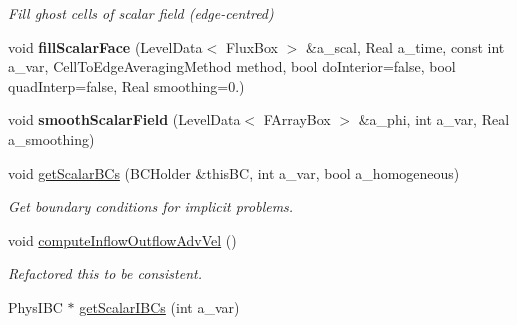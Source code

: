 \begin{DoxyCompactItemize}
\begin{DoxyCompactList}\small\item\em Fill ghost cells of scalar field (edge-\/centred) \end{DoxyCompactList}\item 
\hypertarget{class_a_m_r_level_mushy_layer_a20fcbe7201a07b0e90405b45f806ffc7}{void {\bfseries fill\-Scalar\-Face} (Level\-Data$<$ Flux\-Box $>$ \&a\-\_\-scal, Real a\-\_\-time, const int a\-\_\-var, Cell\-To\-Edge\-Averaging\-Method method, bool do\-Interior=false, bool quad\-Interp=false, Real smoothing=0.)}\label{class_a_m_r_level_mushy_layer_a20fcbe7201a07b0e90405b45f806ffc7}

\item 
\hypertarget{class_a_m_r_level_mushy_layer_aea3d5cfb654cc0e1e0f14bea830add39}{void {\bfseries smooth\-Scalar\-Field} (Level\-Data$<$ F\-Array\-Box $>$ \&a\-\_\-phi, int a\-\_\-var, Real a\-\_\-smoothing)}\label{class_a_m_r_level_mushy_layer_aea3d5cfb654cc0e1e0f14bea830add39}

\item 
\hypertarget{class_a_m_r_level_mushy_layer_a64193ef3a3eba669336ec93b6dde857f}{void \hyperlink{class_a_m_r_level_mushy_layer_a64193ef3a3eba669336ec93b6dde857f}{get\-Scalar\-B\-Cs} (B\-C\-Holder \&this\-B\-C, int a\-\_\-var, bool a\-\_\-homogeneous)}\label{class_a_m_r_level_mushy_layer_a64193ef3a3eba669336ec93b6dde857f}

\begin{DoxyCompactList}\small\item\em Get boundary conditions for implicit problems. \end{DoxyCompactList}\item 
\hypertarget{class_a_m_r_level_mushy_layer_ac533661ed4f32a562f30e7489bbb384f}{void \hyperlink{class_a_m_r_level_mushy_layer_ac533661ed4f32a562f30e7489bbb384f}{compute\-Inflow\-Outflow\-Adv\-Vel} ()}\label{class_a_m_r_level_mushy_layer_ac533661ed4f32a562f30e7489bbb384f}

\begin{DoxyCompactList}\small\item\em Refactored this to be consistent. \end{DoxyCompactList}\item 
\hypertarget{class_a_m_r_level_mushy_layer_a50b7408c664ba80543611da02f5d6900}{Phys\-I\-B\-C $\ast$ \hyperlink{class_a_m_r_level_mushy_layer_a50b7408c664ba80543611da02f5d6900}{get\-Scalar\-I\-B\-Cs} (int a\-\_\-var)}\label{class_a_m_r_level_mushy_layer_a50b7408c664ba80543611da02f5d6900}


\end{DoxyCompactItemize}
